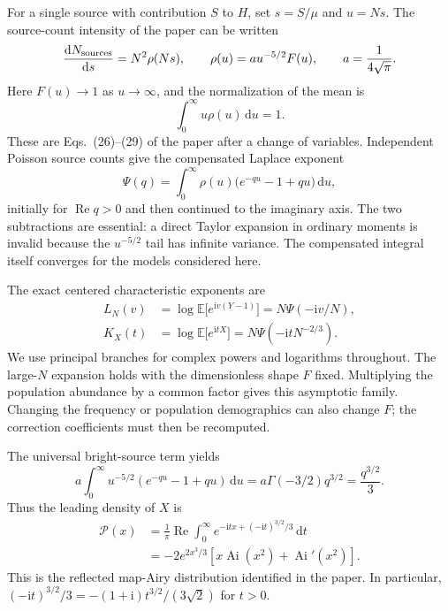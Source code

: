 \documentclass[11pt]{article}
\newcommand{\dd}{\mathrm d}
\newcommand{\ii}{\mathrm i}
\newcommand{\E}{\mathbb E}
\newcommand{\Ai}{\operatorname{Ai}}
\newcommand{\Pstable}{\mathcal P}
\begin{document}
For a single source with contribution $S$ to $H$, set $s=S/\mu$ and $u=Ns$.
The source-count intensity of the paper can be written
\begin{equation}
 \frac{\dd N_{\rm sources}}{\dd s}=N^2\rho(Ns),\qquad
 \rho(u)=a u^{-5/2}F(u),\qquad a=\frac{1}{4\sqrt\pi}.
 \label{eq:rho}
\end{equation}
Here $F(u)\to1$ as $u\to\infty$, and the normalization of the mean is
\begin{equation}
 \int_0^\infty u\rho(u)\,\dd u=1.
 \label{eq:mean}
\end{equation}
These are Eqs.~(26)--(29) of the paper after a change of variables.
Independent Poisson source counts give the compensated Laplace exponent
\begin{equation}
 \Psi(q)=\int_0^\infty \rho(u)
       \bigl(e^{-qu}-1+qu\bigr)\,\dd u,
 \label{eq:Psi}
\end{equation}
initially for $\operatorname{Re}q>0$ and then continued to the imaginary axis.
The two subtractions are essential: a direct Taylor expansion in ordinary
moments is invalid because the $u^{-5/2}$ tail has infinite variance. The
compensated integral itself converges for the models considered here.

The exact centered characteristic exponents are
\begin{align}
 L_N(v)&=\log\E\bigl[e^{\ii v(Y-1)}\bigr]
       =N\Psi(-\ii v/N),\label{eq:LN}\\
 K_X(t)&=\log\E\bigl[e^{\ii tX}\bigr]
       =N\Psi(-\ii tN^{-2/3}).\label{eq:KX}
\end{align}
We use principal branches for complex powers and logarithms throughout.
The large-$N$ expansion holds with the dimensionless shape $F$ fixed.
Multiplying the population abundance by a common factor gives this
asymptotic family. Changing the frequency or population demographics can
also change $F$; the correction coefficients must then be recomputed.

The universal bright-source term yields
\begin{equation}
 a\int_0^\infty u^{-5/2}(e^{-qu}-1+qu)\,\dd u
 =a\Gamma(-3/2)q^{3/2}=\frac{q^{3/2}}3.
 \label{eq:stableexponent}
\end{equation}
Thus the leading density of $X$ is
\begin{align}
 \Pstable(x)&=\frac{1}{\pi}\operatorname{Re}
  \int_0^\infty e^{-\ii tx+(-\ii t)^{3/2}/3}\,\dd t\nonumber\\
 &=-2e^{2x^3/3}\left[x\Ai(x^2)+\Ai'(x^2)\right].
 \label{eq:mapairy}
\end{align}
This is the reflected map-Airy distribution identified in the paper.
In particular, $(-\ii t)^{3/2}/3=-(1+\ii)t^{3/2}/(3\sqrt2)$ for $t>0$.
\end{document}
